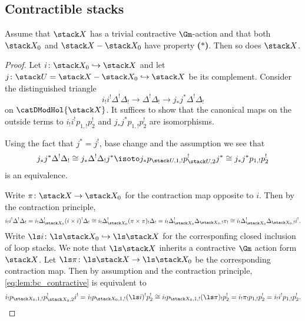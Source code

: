 \documentclass{ck-article}
\newcommand\bc{\textbf{($\mathbf{*}$)}}
\begin{document}

\subsection{Contractible stacks}

\begin{Lem}\label{lem:bc_contractive}
    Assume that $\stack X$ has a trivial contractive $\Gm$-action and that both $\stack X_0$ and $\stack X\setminus \stack X_0$ have property \bc.
    Then so does $\stack X$.
\end{Lem}

\begin{proof}
    Let $i\colon \stack X_0 \hookrightarrow \stack X$ and let $j\colon \stack U =\stack X\setminus \stack X_0 \hookrightarrow \stack X$ be its complement.
    Consider the distinguished triangle
    \[
        i_!i^! \Delta^!\Delta_! \to \Delta^!\Delta_! \to j_*j^*\Delta^!\Delta_!
    \]
    on $\catDModHol{\stack X}$.
    It suffices to show that the canonical maps on the outside terms to $i_!i^! p_{1,!}p_2^!$ and $j_*j^* p_{1,!}p_2^!$ are isomorphisms.
    
    Using the fact that $j^* = j^!$, base change and the assumption we see that
    \[
        j_*j^*\Delta^!\Delta_! \cong
        j_*\Delta^!\Delta_!j^* \isoto
        j_*p_{\stack U,1,!}p_{\stack U,2}^! j^* \cong
        j_*j^* p_{1,!}p_2^!
    \]
    is an equivalence.

    Write $\pi\colon \stack X \to \stack X_0$ for the contraction map opposite to $i$.
    Then by the contraction principle,
    \begin{equation}\label{eq:lem:bc_contractive}
        i_!i^! \Delta^!\Delta_! =
        i_!\Delta_{\stack X_0}^!(i\times i)^! \Delta_! \cong
        i_!\Delta_{\stack X_0}^!(\pi\times \pi)_! \Delta_! =
        i_!\Delta_{\stack X_0}^!\Delta_{\stack X_0,!} \pi_! \cong
        i_!\Delta_{\stack X_0}^!\Delta_{\stack X_0,!} i^!.
    \end{equation}
    Write $\ls i \colon \ls\stack X_0 \hookrightarrow \ls\stack X$ for the corresponfing closed inclusion of loop stacks.
    We note that $\ls\stack X$ inherits a contractive $\Gm$ action form $\stack X$.
    Let $\ls \pi\colon \ls\stack X \to \ls\stack X_0$ be the corresponding contraction map.
    Then by assumption and the contraction principle, \eqref{eq:lem:bc_contractive} is equivalent to
    \[
        i_!p_{\stack X_0,1,!}p_{\stack X_0,2}^! i^! =
        i_!p_{\stack X_0,1,!} (\ls i)^! p_{2}^! \cong
        i_!p_{\stack X_0,1,!} (\ls \pi)_! p_{2}^! =
        i_! \pi_! p_{1,!} p_{2}^! =
        i_! i^! p_{1,!} p_{2}^!. \qedhere
    \]
\end{proof}
\end{document}
